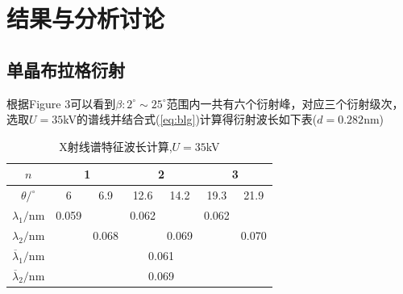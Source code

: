 \documentclass[10.5pt]{article}
\renewcommand{\=}[1]{\stackrel{#1}{=}} %
\theoremstyle{definition}
\theoremstyle{remark}
\begin{document}
	\section{结果与分析讨论}
	\subsection{单晶布拉格衍射}
	根据Figure 3可以看到$\beta:2^\circ\sim25^\circ$范围内一共有六个衍射峰，对应三个衍射级次，选取$U=35 $kV的谱线并结合式(\ref{eq:blg})计算得衍射波长如下表($d=0.282 $nm)
	\begin{table}[htbp]
		\centering
		\caption{X射线谱特征波长计算,$U=35 $kV}
		\begin{tabular}{|c|c|c|c|c|c|c|}
			\hline
			$n$     & \multicolumn{2}{c|}{1} & \multicolumn{2}{c|}{2} & \multicolumn{2}{c|}{3} \bigstrut\\
			\hline
			$\theta/^\circ$ & 6     & 6.9   & 12.6  & 14.2  & 19.3  & 21.9 \bigstrut\\
			\hline
			$\lambda_1/$nm & 0.059  &       & 0.062  &       & 0.062  &  \bigstrut\\
			\hline
			$\lambda_2/$nm &       & 0.068  &       & 0.069  &       & 0.070  \bigstrut\\
			\hline
			$\overline{\lambda}_1/$nm& \multicolumn{6}{c|}{0.061 } \bigstrut\\
			\hline
			$\overline{\lambda}_2/$nm& \multicolumn{6}{c|}{0.069 } \bigstrut\\
			\hline
		\end{tabular}%
	\end{table}%
	
\end{document}
